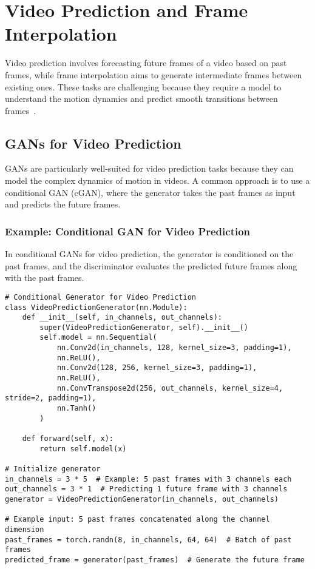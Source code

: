 \section{Video Prediction and Frame Interpolation}
Video prediction involves forecasting future frames of a video based on past frames, while frame interpolation aims to generate intermediate frames between existing ones. These tasks are challenging because they require a model to understand the motion dynamics and predict smooth transitions between frames~\cite{aldausari2022video}.

\subsection{GANs for Video Prediction}
GANs are particularly well-suited for video prediction tasks because they can model the complex dynamics of motion in videos. A common approach is to use a conditional GAN (cGAN), where the generator takes the past frames as input and predicts the future frames.

\subsubsection{Example: Conditional GAN for Video Prediction}
In conditional GANs for video prediction, the generator is conditioned on the past frames, and the discriminator evaluates the predicted future frames along with the past frames.

\begin{lstlisting}[style=python]
# Conditional Generator for Video Prediction
class VideoPredictionGenerator(nn.Module):
    def __init__(self, in_channels, out_channels):
        super(VideoPredictionGenerator, self).__init__()
        self.model = nn.Sequential(
            nn.Conv2d(in_channels, 128, kernel_size=3, padding=1),
            nn.ReLU(),
            nn.Conv2d(128, 256, kernel_size=3, padding=1),
            nn.ReLU(),
            nn.ConvTranspose2d(256, out_channels, kernel_size=4, stride=2, padding=1),
            nn.Tanh()
        )

    def forward(self, x):
        return self.model(x)

# Initialize generator
in_channels = 3 * 5  # Example: 5 past frames with 3 channels each
out_channels = 3 * 1  # Predicting 1 future frame with 3 channels
generator = VideoPredictionGenerator(in_channels, out_channels)

# Example input: 5 past frames concatenated along the channel dimension
past_frames = torch.randn(8, in_channels, 64, 64)  # Batch of past frames
predicted_frame = generator(past_frames)  # Generate the future frame
\end{lstlisting}

